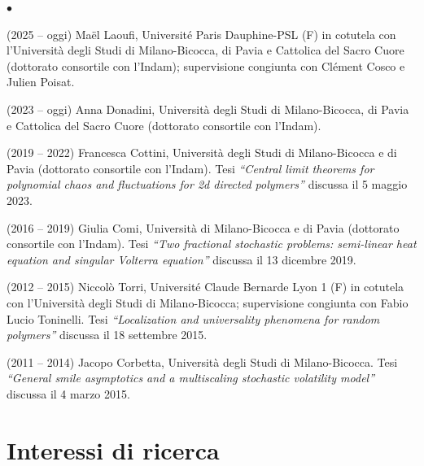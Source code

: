 \documentclass[a4paper,11pt,oneside]{amsart}
\newenvironment{myitemize}{%
\begin{list}{$\bullet$}%
 	{%
	\setlength{\itemsep}{0.3em}%
	\setlength{\topsep}{0.3em}%
	\setlength{\partopsep}{0em}%
	\setlength{\parsep}{0em}%
	\setlength{\parskip}{0em}%
	\setlength\leftmargin{1.5em}%
	\setlength\labelwidth{1.1em}%
	\setlength{\labelsep}{0.4em}%
	}%
	}%
{\end{list}}
\renewenvironment{itemize}{
\begin{myitemize}}%
{\end{myitemize}}
\begin{document}
\begin{itemize}
\item (2025 -- oggi) Maël Laoufi,
Université Paris Dauphine-PSL (F) in cotutela con l'Università degli Studi di Milano-Bicocca, di Pavia 
e Cattolica del Sacro Cuore (dottorato consortile con l'Indam); supervisione congiunta con Clément Cosco e Julien Poisat.

\item (2023 -- oggi) Anna Donadini,
Università degli Studi di Milano-Bicocca, di Pavia e Cattolica del Sacro Cuore
(dottorato consortile con l'Indam).

\item (2019 -- 2022) Francesca Cottini,
Università degli Studi di Milano-Bicocca e di Pavia
(dottorato consortile con l'Indam).
Tesi \emph{``Central limit theorems for polynomial chaos and fluctuations for 2d directed polymers''}
discussa il 5 maggio 2023.

\item (2016 -- 2019) Giulia Comi,
Università di Milano-Bicocca e di Pavia
(dottorato consortile con l'Indam).
Tesi \emph{``Two fractional stochastic problems: semi-linear heat equation 
and singular Volterra equation''} discussa il 13 dicembre 2019.

\item (2012 -- 2015) Niccolò Torri, 
Université Claude Bernarde Lyon 1 (F) in cotutela con
l'Università degli Studi di Milano-Bicocca;
supervisione congiunta con Fabio Lucio Toninelli.
Tesi \emph{``Localization and universality phenomena for
random polymers''} discussa il 18 settembre 2015.


\item (2011 -- 2014) Jacopo Corbetta,
Università degli Studi di Milano-Bicocca.
Tesi \emph{``General smile asymptotics and a multiscaling
stochastic volatility model''} discussa il 4 marzo 2015.

\end{itemize}

\section{Interessi di ricerca}

\end{document}
